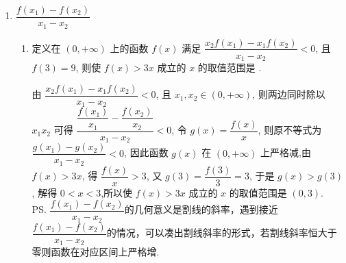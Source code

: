 \begin{enumerate}
\begin{enumerate}
    \item 已知函数 $f(x)=\dfrac{\sqrt{2025-a x}}{a-1}$ 在 $[0,1]$ 上严格减，那么实数 $a$ 的取值的范围是\blkda[3]{$(-\infty, 0) \cup(1,2025]$}.
    \begin{jieda}
    首先判断“定义域”，$2025-ax \geq 0$在$x \in [0, 1]$恒成立，设$g(x) = 2025-ax$，这是一条斜率不确定的线段，只需两个端点满足即可恒成立，即$g(0) \geq 0, g(1) \geq 0$，因此$a \leq 2025$，又因为$a \neq 1$，因此$a \in (-\infty, 1) \cup (1, 2025]$时$f(x)$在$[0, 1]$上有定义.
    综上，实数 $a$ 的取值的范围是 $(-\infty, 0) \cup(1,2025]$. \\
    \ps \textbf{$y = a \cdot f(x)$，即一个函数乘常系数，类型的函数的单调性在$a > 0$时与$f(x)$保持一致，在$a < 0$时与$f(x)$完全相反.}
    \end{jieda}
\end{enumerate}
\item $\dfrac{f(x_1) - f(x_2)}{x_1 - x_2}$
\begin{enumerate}
    \item 定义在 $(0,+\infty)$ 上的函数 $f(x)$ 满足 $\dfrac{x_{2} f\left(x_{1}\right)-x_{1} f\left(x_{2}\right)}{x_{1}-x_{2}}<0$, 且 $f(3)=9$, 则使 $f(x)>3 x$ 成立的 $x$ 的取值范围是 .
    \begin{jieda}
    由 $\dfrac{x_{2} f\left(x_{1}\right)-x_{1} f\left(x_{2}\right)}{x_{1}-x_{2}}<0$, 且 $x_{1}, x_{2} \in(0,+\infty)$, 则两边同时除以 $x_{1} x_{2}$ 可得 $\dfrac{\dfrac{f\left(x_{1}\right)}{x_{1}}-\dfrac{f\left(x_{2}\right)}{x_{2}}}{x_{1}-x_{2}}<0$,
    令 $g(x)=\dfrac{f(x)}{x}$, 则原不等式为 $\dfrac{g\left(x_{1}\right)-g\left(x_{2}\right)}{x_{1}-x_{2}}<0$, 因此函数 $g(x)$ 在 $(0,+\infty)$ 上严格减,由 $f(x)>3 x$, 得 $\dfrac{f(x)}{x}>3$, 又 $g(3)=\dfrac{f(3)}{3}=3$, 于是 $g(x)>g(3)$, 解得 $0<x<3$,所以使 $f(x)>3 x$ 成立的 $x$ 的取值范围是 $(0,3)$. \\
    \ps $\dfrac{f(x_1) - f(x_2)}{x_1 - x_2}$的几何意义是割线的斜率，遇到接近$\dfrac{f(x_1) - f(x_2)}{x_1 - x_2}$的情况，可以凑出割线斜率的形式，若割线斜率恒大于零则函数在对应区间上严格增.

\end{jieda}
\end{enumerate}
\end{enumerate}
